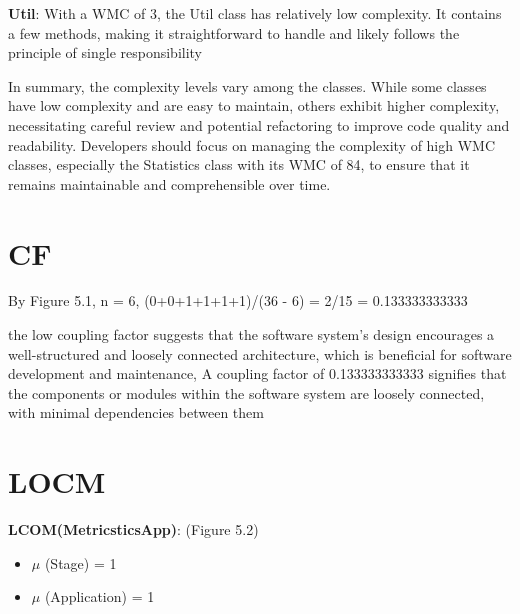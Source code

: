 \documentclass[12pt,letterpaper]{report}
\begin{document}
\textbf{Util}: With a WMC of 3, the Util class has relatively low complexity. It contains a few methods, making it straightforward to handle and likely follows the principle of single responsibility

In summary, the complexity levels vary among the classes. While some classes have low complexity and are easy to maintain, others exhibit higher complexity, necessitating careful review and potential refactoring to improve code quality and readability. Developers should focus on managing the complexity of high WMC classes, especially the Statistics class with its WMC of 84, to ensure that it remains maintainable and comprehensible over time.


\section{CF}
By Figure 5.1, n = 6, (0+0+1+1+1+1)/(36 - 6) = 2/15 = 0.133333333333 

the low coupling factor suggests that the software system's design encourages a well-structured and loosely connected architecture, which is beneficial for software development and maintenance,
A coupling factor of 0.133333333333 signifies that the components or modules within the software system are loosely connected, with minimal dependencies between them

\section{LOCM}

 \smallskip
 \hspace{5mm}
 \textbf{LCOM(MetricsticsApp)}: (Figure 5.2)
 \vspace{1mm}
    \begin{itemize}
        \item \(\mu\) (Stage) = 1
        \item \(\mu\) (Application) = 1
    \end{itemize} 
    \vspace{5mm} \hspace{7mm} 
    \space
    
\end{document}

